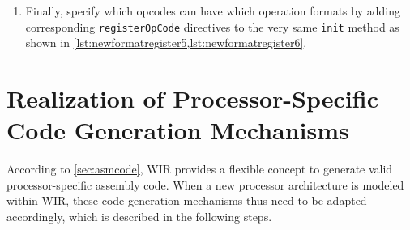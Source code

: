 \begin{enumerate}[resume]
\begin{lstlisting}[style=code,float=t,caption={Operation Format Registration in a New Processor Model's \texttt{init} Method},label=lst:newformatregister]
  [...]
};
\end{lstlisting}

  A concrete example of this operation format registration for the TriCore \texttt{TC13} architecture was given in \cref{lst:tcopfreg} on .

  \item Finally, specify which opcodes can have which operation formats by adding corresponding \texttt{registerOpCode} directives to the very same \texttt{init} method as shown in \cref{lst:newformatregister5,lst:newformatregister6}.
\end{enumerate}


\section{Realization of Processor-Specific Code Generation Mechanisms}
\label{sec:newio}

According to \cref{sec:asmcode}, \gls{WIR} provides a flexible concept to generate valid processor-specific assembly code.
When a new processor architecture is modeled within \gls{WIR}, these code generation mechanisms thus need to be adapted accordingly, which is described in the following steps.

